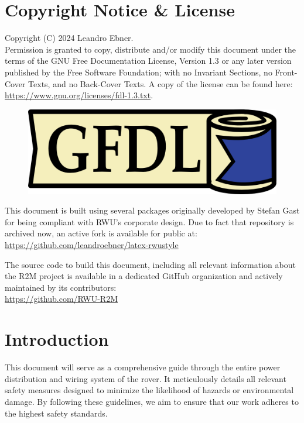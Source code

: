 \section{Copyright Notice \& License}

    Copyright (C)  2024 Leandro Ebner. \\
    Permission is granted to copy, distribute and/or modify this document under the terms of the GNU Free Documentation License, Version 1.3 or any later version published by the Free Software Foundation; with no Invariant Sections, no Front-Cover Texts, and no Back-Cover Texts. A copy of the license can be found here:
    \href{https://www.gnu.org/licenses/fdl-1.3.txt}{https://www.gnu.org/licenses/fdl-1.3.txt}.

    \begin{figure}[h!]
    \includegraphics{contents/figures/gfdl-logo.png}
    \end{figure}

    \vspace{5mm}
    

    This document is built using several packages originally developed by Stefan Gast for being compliant with RWU's corporate design. Due to fact that repository is archived now, an active fork is available for public at: \\
    \href{https://github.com/leandroebner/latex-rwustyle}{https://github.com/leandroebner/latex-rwustyle} 

    The source code to build this document, including all relevant information about the R2M project is available in a dedicated GitHub organization and actively maintained by its contributors: \\
    \href{https://github.com/RWU-R2M}{https://github.com/RWU-R2M}

    
\section{Introduction}

    This document will serve as a comprehensive guide through the entire power distribution and wiring system of the rover. It meticulously details all relevant safety measures designed to minimize the likelihood of hazards or environmental damage. By following these guidelines, we aim to ensure that our work adheres to the highest safety standards. 

